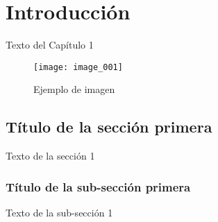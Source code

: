 
\chapter{Introducción}

Texto del Capítulo 1 

\begin{figure}[h]
  \texttt{[image: image\_001]}
  \caption{Ejemplo de imagen}
  \centering
  \label{fig:ejemplo} %
\end{figure}

\section{Título de la sección primera}

Texto de la sección 1 


\subsection{Título de la sub-sección primera}

Texto de la sub-sección 1
